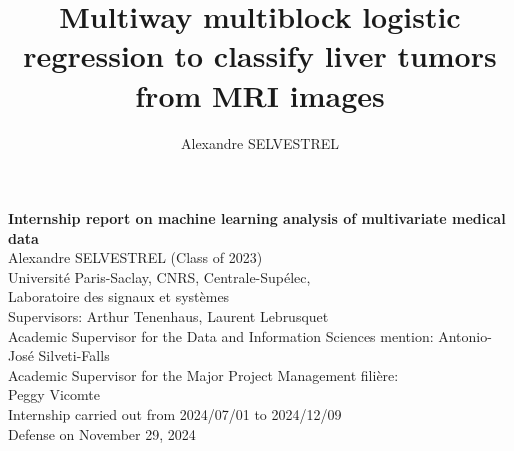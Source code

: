 \documentclass[preprint,12pt]{elsarticle}
\begin{document}

\title{Multiway multiblock logistic regression to classify liver tumors from MRI images} %


\author{Alexandre SELVESTREL} %


            \pagestyle{firstpage}

            \begin{center}
              \vspace*{2cm}
              {\LARGE \textbf{Internship report on machine learning analysis of multivariate medical data}}\\[7em]
              {\large Alexandre SELVESTREL (Class of 2023)}\\
              {\large Université Paris-Saclay, CNRS, Centrale-Supélec,\\[-5 pt]
               Laboratoire des signaux et systèmes}\\
              {\large Supervisors: Arthur Tenenhaus, Laurent Lebrusquet}\\
              \vspace*{\fill}
              {\large Academic Supervisor for the Data and Information Sciences mention: Antonio-José Silveti-Falls}\\
              {\large Academic Supervisor for the Major Project Management filière:\\
               Peggy Vicomte}\\[2em]
              Internship carried out from 2024/07/01 to 2024/12/09 \\
              Defense on November 29, 2024
          \end{center}
\end{document}

